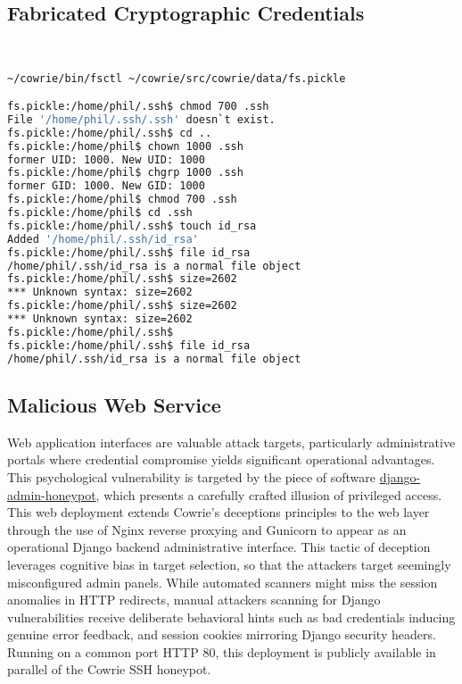 \documentclass{cls/ULBreport}
\begin{document}
    \subsection{Fabricated Cryptographic Credentials}
\begin{lstlisting}[language=bash,label={lst:cowrie-context},caption={TBD}]  


~/cowrie/bin/fsctl ~/cowrie/src/cowrie/data/fs.pickle

fs.pickle:/home/phil/.ssh$ chmod 700 .ssh
File '/home/phil/.ssh/.ssh' doesn`t exist.
fs.pickle:/home/phil/.ssh$ cd ..
fs.pickle:/home/phil$ chown 1000 .ssh
former UID: 1000. New UID: 1000
fs.pickle:/home/phil$ chgrp 1000 .ssh
former GID: 1000. New GID: 1000
fs.pickle:/home/phil$ chmod 700 .ssh
fs.pickle:/home/phil$ cd .ssh
fs.pickle:/home/phil/.ssh$ touch id_rsa
Added '/home/phil/.ssh/id_rsa'
fs.pickle:/home/phil/.ssh$ file id_rsa
/home/phil/.ssh/id_rsa is a normal file object
fs.pickle:/home/phil/.ssh$ size=2602
*** Unknown syntax: size=2602
fs.pickle:/home/phil/.ssh$ size=2602
*** Unknown syntax: size=2602
fs.pickle:/home/phil/.ssh$
fs.pickle:/home/phil/.ssh$ file id_rsa
/home/phil/.ssh/id_rsa is a normal file object
\end{lstlisting}  


    \subsection{Malicious Web Service}
    
Web application interfaces are valuable attack targets, particularly administrative portals where credential compromise yields significant operational advantages. This psychological vulnerability is targeted by the piece of software \href{https://github.com/dmpayton/django-admin-honeypot}{django-admin-honeypot}, which presents a carefully crafted illusion of privileged access. This web deployment extends Cowrie's deceptions principles to the web layer through the use of Nginx reverse proxying and Gunicorn to appear as an operational Django backend administrative interface. This tactic of deception leverages cognitive bias in target selection, so that the attackers target seemingly misconfigured admin panels. While automated scanners might miss the session anomalies in HTTP redirects, manual attackers scanning for Django vulnerabilities receive deliberate behavioral hints such as bad credentials inducing genuine error feedback, and session cookies mirroring Django security headers. Running on a common port HTTP 80, this deployment is publicly available in parallel of the Cowrie SSH honeypot. 
\end{document}
